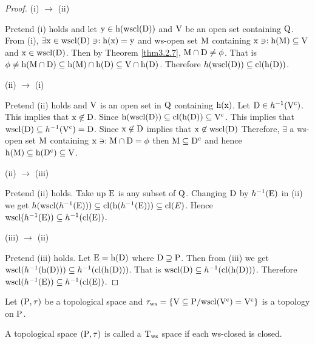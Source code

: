 \begin{proof}
(i) $\to$ (ii)

Pretend (i) holds and let $\mathrm{y}\in \mathrm{h}(\mathrm{wscl}(\mathrm{D}))$ and $\mathrm{V}$ be an open set containing $\mathrm{Q}$. From (i), $\exists \mathrm{x} \in \mathrm{wscl}(\mathrm{D}) \ni: \mathrm{h}(\mathrm{x})=\mathrm{y}$ and ws-open set $\mathrm{M}$ containing $\mathrm{x} \ni: \mathrm{h}(\mathrm{M}) \subseteq \mathrm{V}$ and $\mathrm{x} \in\mathrm{wscl}(\mathrm{D})$. Then by Theorem \ref{thm3.2.7}, $\mathrm{M}\cap \mathrm{D}\neq \phi$. That is $\phi \neq \mathrm{h}(\mathrm{M}\cap \mathrm{D}) \subseteq \mathrm{h}(\mathrm{M}) \cap \mathrm{h}(\mathrm{D}) \subseteq \mathrm{V}\cap \mathrm{h}(\mathrm{D})$. Therefore $h(\mathrm{wscl}(\mathrm{D}))\subseteq \mathrm{cl}(\mathrm{h}(\mathrm{D}))$.

(ii) $\to$ (i)

Pretend (ii) holds and $\mathrm{V}$ is an open set in $\mathrm{Q}$ containing $\mathrm{h}(\mathrm{x})$. Let $\mathrm{D}\in h^{-1} (\mathrm{V}^{\text{c}})$. This implies that $\mathrm{x}\not\in \mathrm{D}$. Since $\mathrm{h}(\mathrm{wscl}(\mathrm{D}))\subseteq \mathrm{cl}(\mathrm{h}(\mathrm{D})) \subseteq \mathrm{V}^{\text{c}}$. This implies that $\mathrm{wscl}(\mathrm{D}) \subseteq  h^{-1} (\mathrm{V}^{\text{c}})=\mathrm{D}$. Since $\mathrm{x}\not\in \mathrm{D}$ implies that $\mathrm{x}\not\in \mathrm{wscl}(\mathrm{D})$ Therefore, $\exists$ a ws-open set $\mathrm{M}$ containing $\mathrm{x} \ni: \mathrm{M}\cap \mathrm{D} = \phi$ then $\mathrm{M}\subseteq \mathrm{D}^{\text{c}}$ and hence $\mathrm{h}(\mathrm{M}) \subseteq \mathrm{h}(\mathrm{D}^{\text{c}}) \subseteq \mathrm{V}$.

(ii) $\to$ (iii)

Pretend (ii) holds. Take up $\mathrm{E}$ is any subset of $\mathrm{Q}$. Changing $\mathrm{D}$ by $h^{-1}(\mathrm{E})$ in (ii) we get $h(\mathrm{wscl}(h^{-1}(\mathrm{E})))\subseteq \mathrm{cl}(\mathrm{h}(h^{-1}(\mathrm{E}))) \subseteq \mathrm{cl}(E)$. Hence $\mathrm{wscl}(h^{-1} (\mathrm{E})) \subseteq  h^{-1}(\mathrm{cl}(\mathrm{E}))$.

(iii) $\to$ (ii)

Pretend (iii) holds. Let $\mathrm{E}=\mathrm{h}(\mathrm{D})$ where $\mathrm{D}\supseteq \mathrm{P}$. Then from (iii) we get $\mathrm{wscl}(h^{-1} (\mathrm{h}(\mathrm{D}))) \subseteq  h^{-1} (\mathrm{cl}(\mathrm{h}(\mathrm{D})))$. That is $\mathrm{wscl}(\mathrm{D}) \subseteq  h^{-1} (\mathrm{cl}(\mathrm{h}(\mathrm{D})))$. Therefore $\mathrm{wscl}(h^{-1}(\mathrm{E})) \subseteq  h^{-1} (\mathrm{cl}(\mathrm{E}))$.
\end{proof}

\begin{dfn}\label{defi3.2.2}
Let $(\mathrm{P}, \tau)$ be a topological space and $\tau_{\text{ws}} =\{\mathrm{V}\subseteq \mathrm{P} / \mathrm{wscl}(\mathrm{V}^{\text{c}})=\mathrm{V}^{\text{c}}\}$ is a topology on $\mathrm{P}$.
\end{dfn}

\begin{dfn}\label{defi3.2.3}
A topological space $(\mathrm{P},\tau)$ is called a $\mathrm{T}_{\text{ws}}$ space if each ws-closed is closed.
\end{dfn}

